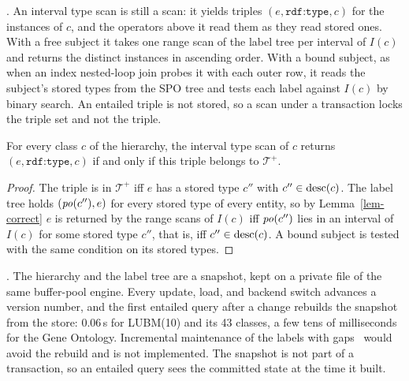 \begin{algorithm}[t]
\caption{\textsc{RewriteTypeScans}$(\mathit{plan})$}\label{alg-rewrite}
\small
{}
\end{algorithm}

.
An interval type scan is still a scan: it yields triples
$(e,\texttt{rdf:type},c)$ for the instances of $c$, and the operators above
it read them as they read stored ones.
With a free subject it takes one range scan of the label tree per interval of
$I(c)$ and returns the distinct instances in ascending order.
With a bound subject, as when an index nested-loop join probes it with each
outer row, it reads the subject's stored types from the SPO tree and tests
each label against $I(c)$ by binary search.
An entailed triple is not stored, so a scan under a transaction locks the
triple set and not the triple.

\begin{lemma}\label{lem-rewrite}
For every class $c$ of the hierarchy, the interval type scan of $c$ returns
$(e,\texttt{rdf:type},c)$ if and only if this triple belongs to $\mathcal{T}^{+}$.
\end{lemma}
\iffull
\begin{proof}
The triple is in $\mathcal{T}^{+}$ iff $e$ has a stored type $c''$ with
$c''\in\mathrm{desc}(c)$.
The label tree holds $(\mathit{po}(c''),e)$ for every stored type of every entity, so by
Lemma~\ref{lem-correct} $e$ is returned by the range scans of $I(c)$ iff
$\mathit{po}(c'')$ lies in an interval of $I(c)$ for some stored type $c''$, that is,
iff $c''\in\mathrm{desc}(c)$.
A bound subject is tested with the same condition on its stored types.
\end{proof}
\fi

.
The hierarchy and the label tree are a snapshot, kept on a private file of the
same buffer-pool engine.
Every update, load, and backend switch advances a version number, and the first
entailed query after a change rebuilds the snapshot from the store: 0.06\,s
for LUBM(10) and its 43 classes, a few tens of milliseconds for the Gene
Ontology.
Incremental maintenance of the labels with gaps~\cite{agrawal1989} would avoid
the rebuild and is not implemented.
The snapshot is not part of a transaction, so an entailed query sees the
committed state at the time it built.
